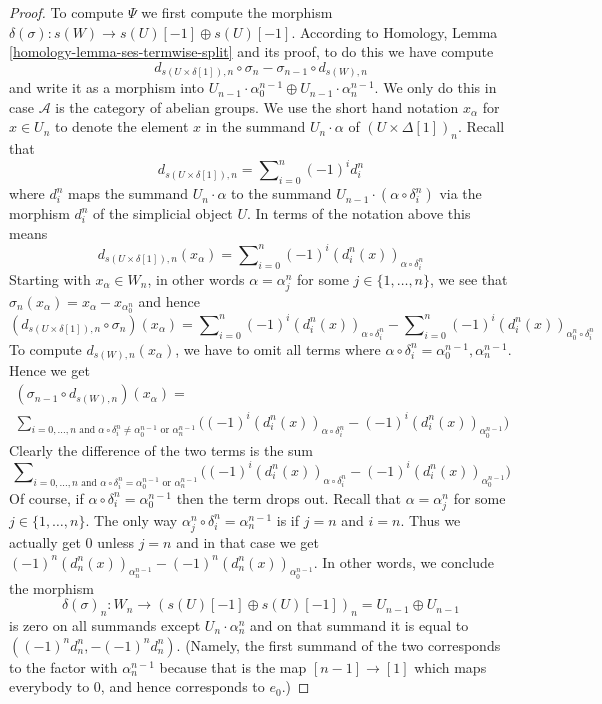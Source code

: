 \begin{proof}
\medskip\noindent
To compute $\Psi$ we first compute the morphism
$\delta(\sigma) : s(W) \to s(U)[-1] \oplus s(U)[-1]$.
According to Homology, Lemma \ref{homology-lemma-ses-termwise-split}
and its proof,
to do this we have compute
$$
d_{s(U \times \delta[1]), n} \circ \sigma_n
-
\sigma_{n - 1} \circ d_{s(W), n}
$$
and write it as a morphism into
$U_{n - 1} \cdot \alpha^{n - 1}_0 \oplus U_{n - 1} \cdot \alpha^{n - 1}_n$.
We only do this in case $\mathcal{A}$ is the category of abelian
groups. We use the short hand notation $x_{\alpha}$ for $x \in U_n$
to denote the element $x$ in the summand $U_n \cdot \alpha$
of $(U \times \Delta[1])_n$. Recall that
$$
d_{s(U \times \delta[1]), n}
=
\sum\nolimits_{i = 0}^n (-1)^i d^n_i
$$
where $d^n_i$ maps the summand $U_n \cdot \alpha$
to the summand $U_{n - 1} \cdot (\alpha \circ \delta^n_i)$
via the morphism $d^n_i$ of the simplicial object $U$.
In terms of the notation above this means
$$
d_{s(U \times \delta[1]), n}(x_\alpha) =
\sum\nolimits_{i = 0}^n (-1)^i (d^n_i(x))_{\alpha \circ \delta^n_i}
$$
Starting with $x_\alpha \in W_n$, in other words $\alpha = \alpha^n_j$
for some $j \in \{1, \ldots, n\}$, we see that
$\sigma_n(x_\alpha) = x_\alpha - x_{\alpha^n_0}$ and
hence
$$
(d_{s(U \times \delta[1]), n} \circ \sigma_n)(x_\alpha)
=
\sum\nolimits_{i = 0}^n (-1)^i (d^n_i(x))_{\alpha \circ \delta^n_i}
-
\sum\nolimits_{i = 0}^n (-1)^i (d^n_i(x))_{\alpha^n_0 \circ \delta^n_i}
$$
To compute $d_{s(W), n}(x_\alpha)$, we have to omit
all terms where $\alpha \circ \delta^n_i = \alpha^{n - 1}_0, \alpha^{n - 1}_n$.
Hence we get
$$
\begin{matrix}
(\sigma_{n - 1} \circ d_{s(W), n})(x_\alpha) = \\
\sum\nolimits_{i = 0, \ldots, n\text{ and }
\alpha \circ \delta^n_i \not = \alpha^{n - 1}_0\text{ or }\alpha^{n - 1}_n}
\Big((-1)^i (d^n_i(x))_{\alpha \circ \delta^n_i}
-
(-1)^i (d^n_i(x))_{\alpha^{n - 1}_0}
\Big)
\end{matrix}
$$
Clearly the difference of the two terms is the sum
$$
\sum\nolimits_{i = 0, \ldots, n\text{ and }
\alpha \circ \delta^n_i = \alpha^{n - 1}_0\text{ or }\alpha^{n - 1}_n}
\Big((-1)^i (d^n_i(x))_{\alpha \circ \delta^n_i}
-
(-1)^i (d^n_i(x))_{\alpha^{n - 1}_0}
\Big)
$$
Of course, if $\alpha \circ \delta^n_i = \alpha^{n - 1}_0$
then the term drops out. Recall that $\alpha = \alpha^n_j$
for some $j \in \{1, \ldots, n\}$. The only way
$\alpha^n_j \circ \delta^n_i = \alpha^{n - 1}_n$
is if $j = n$ and $i = n$. Thus we actually get
$0$ unless $j = n$ and in that case we get
$(-1)^n(d^n_n(x))_{\alpha^{n - 1}_n} - (-1)^n(d^n_n(x))_{\alpha^{n - 1}_0}$.
In other words, we conclude the morphism
$$
\delta(\sigma)_n :
W_n
\to
(s(U)[-1] \oplus s(U)[-1])_n = U_{n - 1} \oplus U_{n - 1}
$$
is zero on all summands except $U_n \cdot \alpha^n_n$
and on that summand it is equal to $((-1)^nd^n_n, -(-1)^nd^n_n)$.
(Namely, the first summand of the two corresponds to the factor
with $\alpha^{n - 1}_n$ because that is the map $[n - 1] \to [1]$
which maps everybody to $0$, and hence corresponds to $e_0$.)


\end{proof}
